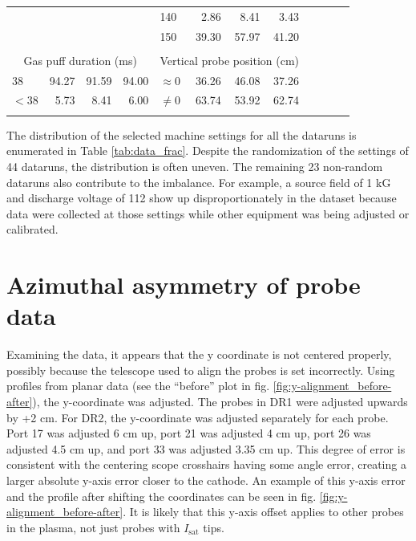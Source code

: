 \begin{table}
\begin{tabular}{lrrr|lrrr|lrrr}
                      & & & & 140 & 2.86 & 8.41 & 3.43     &                       & & & \\
                      & & & & 150 & 39.30 & 57.97 & 41.20  &                       & & & \\
		\\
		\multicolumn{4}{c|}{Gas puff duration (ms)} & \multicolumn{4}{c}{Vertical probe position (cm)}\\
		\cline{0-7} \cline{0-7}
		$38$ & 94.27 & 91.59 & 94.00 & $\approx 0$ & 36.26 & 46.08 & 37.26 & \\
		$<38$ & 5.73 & 8.41 & 6.00    & $\neq 0$ & 63.74 & 53.92 & 62.74    & \\
		\multicolumn{12}{l}{}
	\end{tabular}
\end{table}

The distribution of the selected machine settings for all the dataruns is enumerated in Table \ref{tab:data_frac}. Despite the randomization of the settings of 44 dataruns, the distribution is often uneven. The remaining 23 non-random dataruns also contribute to the imbalance. For example, a source field of 1 kG and discharge voltage of 112 show up disproportionately in the dataset because data were collected at those settings while other equipment was being adjusted or calibrated.

\section{Azimuthal asymmetry of probe data}

Examining the data, it appears that the y coordinate is not centered properly, possibly because the telescope used to align the probes is set incorrectly. Using profiles from planar data (see the ``before'' plot in fig. \ref{fig:y-alignment_before-after}), the y-coordinate was adjusted. The probes in DR1 were adjusted upwards by +2 cm. For DR2, the y-coordinate was adjusted separately for each probe. Port 17 was adjusted 6 cm up, port 21 was adjusted 4 cm up, port 26 was adjusted 4.5 cm up, and port 33 was adjusted 3.35 cm up. This degree of error is consistent with the centering scope crosshairs having some angle error, creating a larger absolute y-axis error closer to the cathode. An example of this y-axis error and the profile after shifting the coordinates can be seen in fig. \ref{fig:y-alignment_before-after}. It is likely that this y-axis offset applies to other probes in the plasma, not just probes with $I_\text{sat}$ tips. 

